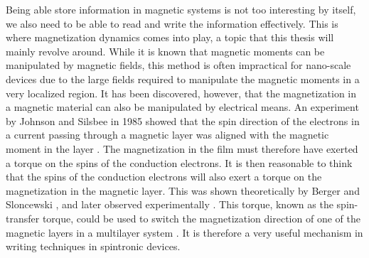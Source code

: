 Being able store information in magnetic systems is not too interesting by itself, we also need to be able to read and write the information effectively. This is where magnetization dynamics comes into play, a topic that this thesis will mainly revolve around. While it is known that magnetic moments can be manipulated by magnetic fields, this method is often impractical for nano-scale devices due to the large fields required to manipulate the magnetic moments in a very localized region. It has been discovered, however, that the magnetization in a magnetic material can also be manipulated by electrical means. An experiment by Johnson and Silsbee in 1985 showed that the spin direction of the electrons in a current passing through a magnetic layer was aligned with the magnetic moment in the layer \cite{JohnsonSilsbee1985}. The magnetization in the film must therefore have exerted a torque on the spins of the conduction electrons. It is then reasonable to think that the spins of the conduction electrons will also exert a torque on the magnetization in the magnetic layer. This was shown theoretically by Berger \cite{Berger1996} and Sloncewski \cite{Slonczewski1996}, and later observed experimentally \cite{Tsoi1998}. This torque, known as the spin-transfer torque, could be used to switch the magnetization direction of one of the magnetic layers in a multilayer system \cite{Myers1999,Sun1999,Katine2000}. It is therefore a very useful mechanism in writing techniques in spintronic devices.



